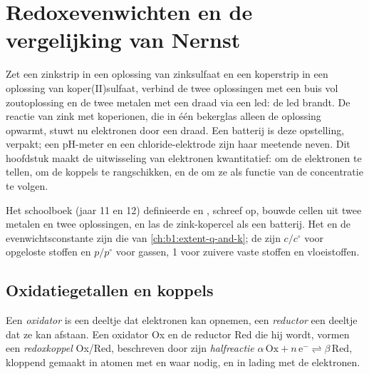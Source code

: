 \chapter{Redoxevenwichten en de vergelijking van Nernst}\label{ch:b1:nernst}

Zet een zinkstrip in een oplossing van zinksulfaat en een koperstrip in
een oplossing van koper(II)\-sulfaat, verbind de twee oplossingen met een
buis vol zoutoplossing en de twee metalen met een draad via een led: de
led brandt. De reactie van zink met koperionen, die in één bekerglas
alleen de oplossing opwarmt, stuwt nu elektronen door een draad. Een
batterij is deze opstelling, verpakt; een pH-meter en een
chloride-elektrode zijn haar meetende neven. Dit hoofdstuk maakt de
uitwisseling van elektronen kwantitatief:  om de
elektronen te tellen,  om de koppels te rangschikken,
en de  om ze als functie van de concentratie te
volgen.

\begin{recall}
Het schoolboek (jaar 11 en 12) definieerde  en ,
schreef  op, bouwde cellen uit twee metalen en twee
oplossingen, en las de zink-kopercel als een batterij. Het
 en de evenwichtsconstante zijn die van
\cref{ch:b1:extent-q-and-k}; de  zijn $c/c^\circ$ voor
opgeloste stoffen en $p/p^\circ$ voor gassen, 1 voor zuivere vaste
stoffen en vloeistoffen.
\end{recall}

\section{Oxidatiegetallen en koppels}

\begin{definition}\label{def:b1:nernst:couple}
Een \emph{oxidator} is een deeltje dat elektronen kan
opnemen, een \emph{reductor} een deeltje dat ze kan
afstaan. Een oxidator Ox en de reductor Red die hij wordt, vormen een
\emph{redoxkoppel} Ox/Red, beschreven door zijn
\emph{halfreactie}
$\alpha\,\mathrm{Ox} + n\,\mathrm{e^-} \rightleftharpoons
\beta\,\mathrm{Red}$, kloppend gemaakt in atomen met  en 
waar nodig, en in lading met de elektronen.
\end{definition}

